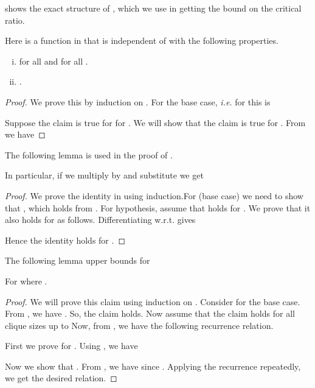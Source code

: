 \documentclass[runningheads,a4paper]{llncs}
\begin{document}
 shows the exact structure of ,  which we use in getting the bound on the critical ratio. 
\begin{lemma}
\label{lem:app-num-term}

Here  is a function in  that is independent of  with the following properties. 
\begin{enumerate}[(i)]
\item  for all  and  for all .
\item .
\end{enumerate}
\end{lemma}

\begin{proof}
We prove this by induction on . For the base case, {\em i.e.} for  this is 


Suppose the claim is true for  for . We will show that the claim is true for . From  we have


\end{proof}
The following lemma is used in the proof of .
\begin{lemma}\label{lem:app-fact-mom}

In particular, if we multiply  by  and substitute  we get

\end{lemma}
\begin{proof}
We prove the identity in  using induction.For  (base case) we need to show that
, which holds from . For hypothesis, assume that  holds for . We prove that it also holds for  as follows. 
Differentiating  w.r.t.  gives 


Hence the identity holds for .
\end{proof}



The following lemma upper bounds  for 
\begin{lemma}\label{lem:app-f-upper-bound}
For   where . 
\end{lemma}

\begin{proof}
We will prove this claim using induction on . Consider  for the base case. From , we have . So, the claim holds. Now assume that the claim holds for all clique sizes up to  
Now, from , we have the following recurrence relation. 


First we prove for . Using , we have 


Now we show that . From , we have  since . 
Applying the recurrence repeatedly, we get the desired relation.
\end{proof}
\end{document}

